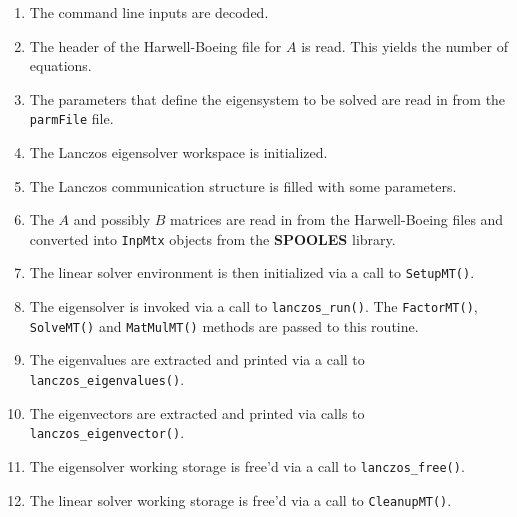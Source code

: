 \begin{enumerate}
\item
The command line inputs are decoded.
\item
The header of the Harwell-Boeing file for $A$ is read.
This yields the number of equations.
\item
The parameters that define the eigensystem to be solved
are read in from the {\tt parmFile} file.
\item
The Lanczos eigensolver workspace is initialized.
\item
The Lanczos communication structure is filled with some parameters.
\item
The $A$ and possibly $B$ matrices are read in from the
Harwell-Boeing files and converted into {\tt InpMtx} objects
from the {\bf SPOOLES} library.
\item
The linear solver environment is then initialized via a call to 
{\tt SetupMT()}.
\item
The eigensolver is invoked via a call to {\tt lanczos\_run()}.
The {\tt FactorMT()}, {\tt SolveMT()} and {\tt MatMulMT()} methods
are passed to this routine.
\item
The eigenvalues are extracted and printed via a call to
{\tt lanczos\_eigenvalues()}.
\item
The eigenvectors are extracted and printed via calls to
{\tt lanczos\_eigenvector()}.
\item
The eigensolver working storage is free'd via a call to
{\tt lanczos\_free()}.
\item
The linear solver working storage is free'd via a call to
{\tt CleanupMT()}.
\end{enumerate}
